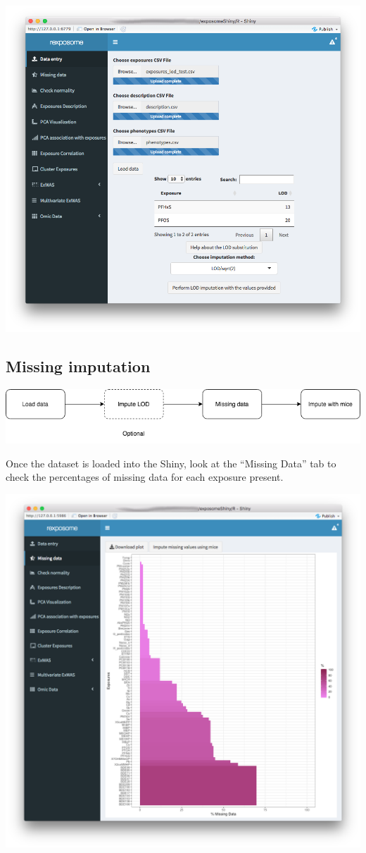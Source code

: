 \documentclass[
]{book}
\begin{document}
\includegraphics{images/analysis1_3.png}

\hypertarget{missing-imputation}{%
\subsection{Missing imputation}\label{missing-imputation}}

\includegraphics{images/analysis2_1.png}

Once the dataset is loaded into the Shiny, look at the ``Missing Data'' tab to check the percentages of missing data for each exposure present.

\includegraphics{images/analysis2_2.png}
\end{document}
